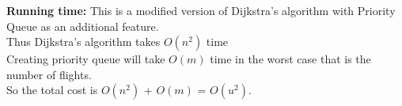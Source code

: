 \documentclass[11pt]{article}
\newcommand\runtime{\vspace{.10in}\textbf{Running time: }}
\begin{document}
\runtime This is a modified version of Dijkstra's algorithm with Priority Queue as an additional feature.\\
Thus Dijkstra's algorithm takes $O(n^2)$ time\\
Creating priority queue will take $O(m)$ time in the worst case that is the number of flights.\\
So the total cost is $O(n^2)$ + $O(m)$ = $O(u^2)$. 
 
\end{document}
